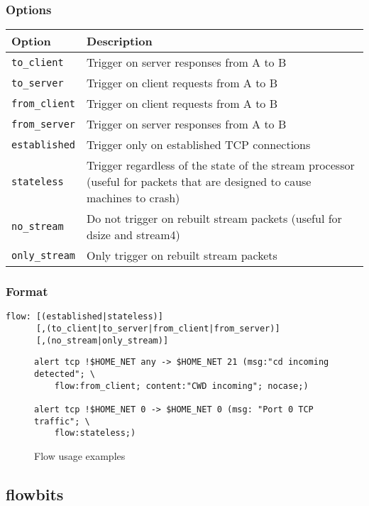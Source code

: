\documentclass[english]{report}
\begin{document}
\subsubsection*{Options}

\begin{tabular}{| l | p{5in} |}
\hline
{\bf Option} & {\bf Description}\\
\hline
\hline
\texttt{to\_client} & Trigger on server responses from A to B\\
\hline
\texttt{to\_server} & Trigger on client requests from A to B\\
\hline
\texttt{from\_client} & Trigger on client requests from A to B\\
\hline
\texttt{from\_server} & Trigger on server responses from A to B\\
\hline
\texttt{established} & Trigger only on established TCP connections\\
\hline
\texttt{stateless} & Trigger regardless of the state of the stream processor
(useful for packets that are designed to cause machines to crash)\\
\hline
\texttt{no\_stream} & Do not trigger on rebuilt stream packets (useful 
for dsize and stream4)\\
\hline
\texttt{only\_stream} & Only trigger on rebuilt stream
packets\\
\hline
\end{tabular}

\subsubsection{Format}

\begin{verbatim}
flow: [(established|stateless)] 
      [,(to_client|to_server|from_client|from_server)]
      [,(no_stream|only_stream)]
\end{verbatim}
%
\begin{figure}[!hbpt]
\begin{verbatim}
alert tcp !$HOME_NET any -> $HOME_NET 21 (msg:"cd incoming detected"; \
    flow:from_client; content:"CWD incoming"; nocase;)

alert tcp !$HOME_NET 0 -> $HOME_NET 0 (msg: "Port 0 TCP traffic"; \
    flow:stateless;)
\end{verbatim}

\caption{Flow usage examples\label{flow usage examples}}
\end{figure}

\subsection{flowbits\label{flowbits}}
\end{document}
